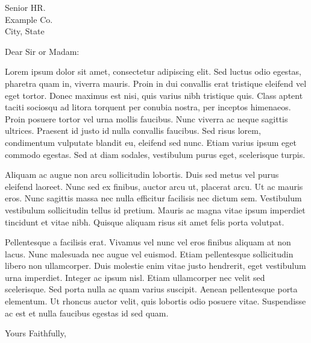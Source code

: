 \documentclass{../simpler-cl}
\begin{document}
\begin{letter}{Senior HR. \\Example Co.\\City, State}

    \opening{Dear Sir or Madam:}
    Lorem ipsum dolor sit amet, consectetur adipiscing elit. Sed luctus odio egestas, pharetra quam in, viverra mauris. Proin in dui convallis erat tristique eleifend vel eget tortor. Donec maximus est nisi, quis varius nibh tristique quis. Class aptent taciti sociosqu ad litora torquent per conubia nostra, per inceptos himenaeos. Proin posuere tortor vel urna mollis faucibus. Nunc viverra ac neque sagittis ultrices. Praesent id justo id nulla convallis faucibus. Sed risus lorem, condimentum vulputate blandit eu, eleifend sed nunc. Etiam varius ipsum eget commodo egestas. Sed at diam sodales, vestibulum purus eget, scelerisque turpis.

    Aliquam ac augue non arcu sollicitudin lobortis. Duis sed metus vel purus eleifend laoreet. Nunc sed ex finibus, auctor arcu ut, placerat arcu. Ut ac mauris eros. Nunc sagittis massa nec nulla efficitur facilisis nec dictum sem. Vestibulum vestibulum sollicitudin tellus id pretium. Mauris ac magna vitae ipsum imperdiet tincidunt et vitae nibh. Quisque aliquam risus sit amet felis porta volutpat.

    Pellentesque a facilisis erat. Vivamus vel nunc vel eros finibus aliquam at non lacus. Nunc malesuada nec augue vel euismod. Etiam pellentesque sollicitudin libero non ullamcorper. Duis molestie enim vitae justo hendrerit, eget vestibulum urna imperdiet. Integer ac ipsum nisl. Etiam ullamcorper nec velit sed scelerisque. Sed porta nulla ac quam varius suscipit. Aenean pellentesque porta elementum. Ut rhoncus auctor velit, quis lobortis odio posuere vitae. Suspendisse ac est et nulla faucibus egestas id sed quam.
    \closing{Yours Faithfully,}

\end{letter}
\end{document}
